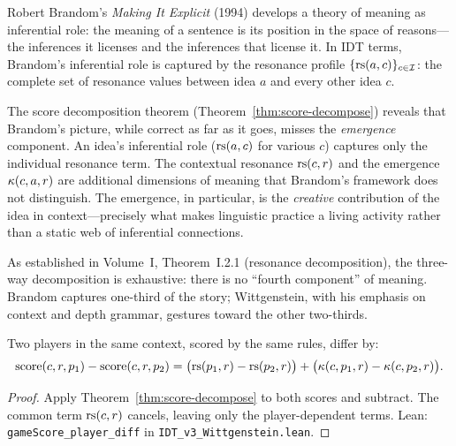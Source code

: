\begin{interpretation}
Robert Brandom's \textit{Making It Explicit} (1994) develops a theory of meaning
as inferential role: the meaning of a sentence is its position in the space of
reasons---the inferences it licenses and the inferences that license it. In
IDT terms, Brandom's inferential role is captured by the resonance profile
$\{\mathrm{rs}(a, c)\}_{c \in \mathcal{I}}$: the complete set of resonance values between
idea $a$ and every other idea $c$.

The score decomposition theorem (Theorem~\ref{thm:score-decompose}) reveals
that Brandom's picture, while correct as far as it goes, misses the
\emph{emergence} component. An idea's inferential role ($\mathrm{rs}(a, c)$ for various
$c$) captures only the individual resonance term. The contextual resonance
$\mathrm{rs}(c, r)$ and the emergence $\kappa(c, a, r)$ are additional dimensions of
meaning that Brandom's framework does not distinguish. The emergence, in
particular, is the \emph{creative} contribution of the idea in context---precisely
what makes linguistic practice a living activity rather than a static web of
inferential connections.

As established in Volume~I, Theorem~I.2.1 (resonance decomposition), the
three-way decomposition is exhaustive: there is no ``fourth component'' of
meaning. Brandom captures one-third of the story; Wittgenstein, with his
emphasis on context and depth grammar, gestures toward the other two-thirds.
\end{interpretation}

\begin{theorem}
\label{thm:player-comparison}
Two players in the same context, scored by the same rules, differ by:
\[
\mathrm{score}(c, r, p_1) - \mathrm{score}(c, r, p_2)
= \bigl(\mathrm{rs}(p_1, r) - \mathrm{rs}(p_2, r)\bigr)
  + \bigl(\kappa(c, p_1, r) - \kappa(c, p_2, r)\bigr).
\]
\end{theorem}

\begin{proof}
Apply Theorem~\ref{thm:score-decompose} to both scores and subtract. The
common term $\mathrm{rs}(c, r)$ cancels, leaving only the player-dependent terms.
Lean: \texttt{gameScore\_player\_diff} in \texttt{IDT\_v3\_Wittgenstein.lean}.
\end{proof}


